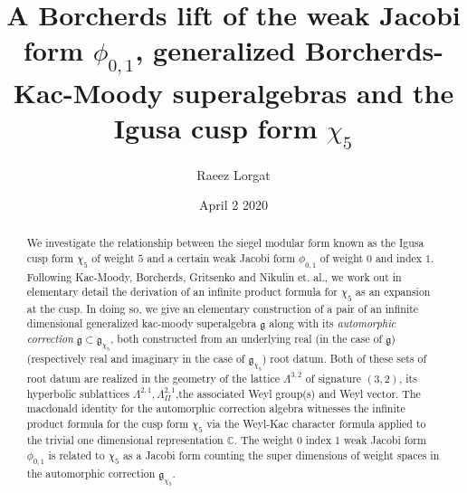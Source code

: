 \documentclass[9pt]{amsart} \usepackage[utf8]{inputenc}
\title{A Borcherds lift of the weak Jacobi form $\phi_{0,1}$,
generalized Borcherds-Kac-Moody superalgebras and the Igusa cusp form $\chi_5$}
\author{Raeez Lorgat } \date{April 2 2020}
\newcommand{\Z}{\mathbb{Z}} \newcommand{\C}{\mathbb{C}}
\newcommand{\R}{\mathbb{R}} \newcommand{\La}{\Lambda}
\newcommand{\Sp}{\mathbf{Sp}}
\newcommand{\Hpl}{\mathcal{H}}
\newcommand{\IV}{\mathbf{IV}}
\newcommand{\fbasis}{(f_i)_{\{1,2,3,-2,-1\}}}
\newcommand{\Id}{\mathbf{I}}
\newcommand{\bkm}{\mathfrak{g}}
\newcommand{\autcor}{\mathfrak{g}_{\chi_5}}
\begin{document}
\maketitle

\begin{abstract} We investigate the relationship between the siegel
modular form known as the Igusa cusp form $\chi_5$ of weight $5$ and a
certain weak Jacobi form $\phi_{0,1}$ of weight $0$ and index $1$. Following
Kac-Moody, Borcherds, Gritsenko and Nikulin et. al., we work out in
elementary detail the derivation of an infinite product formula for
$\chi_5$ as an expansion at the cusp. In doing so, we give an elementary
construction of a pair of an infinite dimensional generalized kac-moody
superalgebra $\bkm$ along with its \textit{automorphic
correction} $\bkm\subset
\autcor$, both constructed from an underlying
real (in the case of $\bkm$) (respectively real and
imaginary in the case of $\autcor$) root datum.
Both of these sets of root datum are realized in the geometry of the
lattice $\La^{3,2}$ of signature $(3,2)$, its hyperbolic
sublattices $\La^{2,1}, \La^{2,1}_{II}$,the associated Weyl group(s) and
Weyl vector. The macdonald identity for the automorphic correction
algebra witnesses the infinite product formula for the cusp form
$\chi_5$ via the Weyl-Kac character formula applied to the trivial one
dimensional representation $\C$. The weight 0 index 1 weak Jacobi form
$\phi_{0,1}$ is related to $\chi_5$ as a Jacobi form counting the
super dimensions of weight spaces in the automorphic
correction $\autcor$.  \end{abstract}

\end{document}
